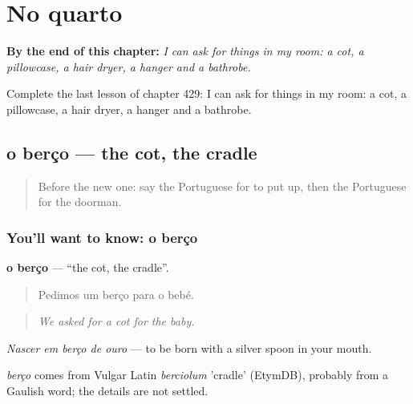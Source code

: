 
\chapter{No quarto}
\label{ch:pt-no-quarto}

\begin{chapteropening}
\textbf{By the end of this chapter:} \emph{I can ask for things in my room: a cot, a pillowcase, a hair dryer, a hanger and a bathrobe.}

Complete the last lesson of chapter 429: I can ask for things in my room: a cot, a pillowcase, a hair dryer, a hanger and a bathrobe.
\end{chapteropening}

\section[o berço]{o berço — the cot, the cradle}

\label{lesson:PT-C429-berco}



\begin{quote}
Before the new one: say the Portuguese for to put up, then the Portuguese for the doorman.
\end{quote}

\subsection*{You'll want to know: o berço}
\textbf{o berço} — \textquotedblleft{}the cot, the cradle\textquotedblright{}.

\begin{quote}
Pedimos um berço para o bebé.
\end{quote}

\begin{quote}
\emph{We asked for a cot for the baby.}
\end{quote}

\emph{Nascer em berço de ouro} — to be born with a silver spoon in your mouth.

\begin{cousinweb}
\emph{berço} comes from Vulgar Latin \emph{berciolum} 'cradle' (EtymDB), probably from a Gaulish word; the details are not settled.
\end{cousinweb}

